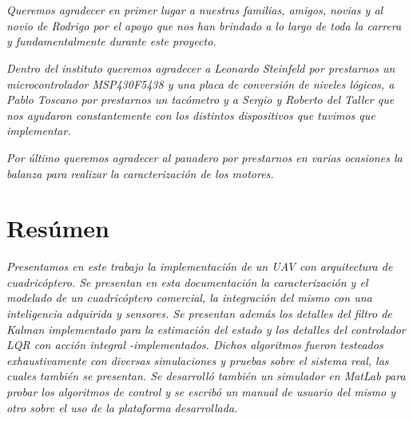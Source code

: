 \documentclass[main]{subfiles}
\begin{document}
\chapter*{}
\begin{flushright}
\textit{
Queremos agradecer en primer lugar a nuestras familias, amigos, novias 
y al novio de Rodrigo por el apoyo que nos han brindado a lo largo de
toda la carrera y fundamentalmente durante este proyecto.}
\end{flushright}

\begin{flushright}
\textit{
Dentro del instituto queremos agradecer a Leonardo Steinfeld por prestarnos un microcontrolador MSP430F5438 y una placa de 
conversi\'on de niveles l\'ogicos, a Pablo Toscano por prestarnos un tac\'ometro y a Sergio y Roberto del Taller que nos ayudaron constantemente con los distintos dispositivos que tuvimos que implementar.
}
\end{flushright} 

\begin{flushright}
\textit{
Por \'ultimo queremos agradecer al panadero por prestarnos en varias ocasiones la balanza para realizar la caracterizaci\'on de los motores.
}
\end{flushright}



\chapter*{Res\'umen}
\begin{flushright}
\textit{Presentamos en este trabajo la implementaci\'on de un UAV con arquitectura de cuadric\'optero. Se presentan en esta documentaci\'on la caracterizaci\'on y el modelado de un cuadric\'optero comercial, la integraci\'on del mismo con una inteligencia adquirida y sensores. Se presentan adem\'as los detalles del filtro de Kalman implementado para la estimaci\'on del estado y los detalles del controlador LQR con acci\'on integral -implementados. Dichos algoritmos fueron testeados exhaustivamente con diversas simulaciones y pruebas sobre el sistema real, las cuales tambi\'en se presentan. Se desarroll\'o tambi\'en un simulador en \emph{MatLab} para probar los algoritmos de control y se escrib\'o un manual de usuario del mismo y otro sobre el uso de la plataforma desarrollada.
}
\end{flushright}
\end{document}
